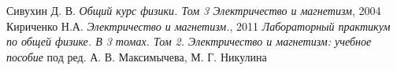 \documentclass[a4paper]{article}
\begin{document}
\begin{thebibliography}{9}
	 Сивухин Д. В. \emph{Общий курс физики. Том 3 Электричество и магнетизм}, 2004
	 Кириченко Н.А. \emph{Электричество и магнетизм.}, 2011
	 \emph{Лабораторный практикум по общей физике. В 3 томах. Том 2. Электричество и магнетизм: учебное пособие} под ред. А. В. Максимычева, М. Г. Никулина
\end{thebibliography}
\end{document}
